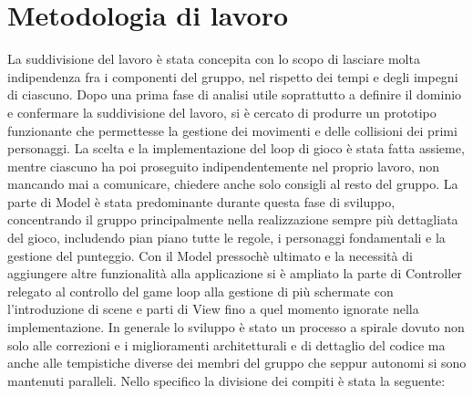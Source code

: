 \documentclass[a4paper,12pt, hidelinks]{report}
\begin{document}
\section{Metodologia di lavoro}

La suddivisione del lavoro è stata concepita con lo scopo di lasciare molta indipendenza fra i componenti del gruppo, nel rispetto dei tempi e degli impegni di ciascuno. Dopo una prima fase di analisi utile soprattutto a definire il dominio e confermare la suddivisione del lavoro, si è cercato di produrre un prototipo funzionante che permettesse la gestione dei movimenti e delle collisioni dei primi personaggi. La scelta e la implementazione del loop di gioco è stata fatta assieme, mentre ciascuno ha poi proseguito indipendentemente nel proprio lavoro, non mancando mai a comunicare, chiedere anche solo consigli al resto del gruppo. La parte di Model è stata predominante durante questa fase di sviluppo, concentrando il gruppo principalmente nella realizzazione sempre più dettagliata del gioco, includendo pian piano tutte le regole, i personaggi fondamentali e la gestione del punteggio. Con il Model pressochè ultimato e la necessità di aggiungere altre funzionalità alla applicazione si è ampliato la parte di Controller relegato al controllo del game loop alla gestione di più schermate con l'introduzione di scene e parti di View fino a quel momento ignorate nella implementazione. In generale lo sviluppo è stato un processo a spirale dovuto non solo alle correzioni e i miglioramenti architetturali e di dettaglio del codice ma anche alle tempistiche diverse dei membri del gruppo che seppur autonomi si sono mantenuti paralleli.
Nello specifico la divisione dei compiti è stata la seguente:
\end{document}
